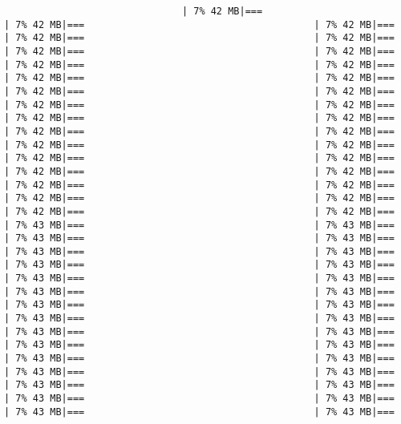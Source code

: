 \documentclass[
]{article}
\begin{document}
\begin{verbatim}
                               | 7% 42 MB|===                                        | 7% 42 MB|===                                        | 7% 42 MB|===                                        | 7% 42 MB|===                                        | 7% 42 MB|===                                        | 7% 42 MB|===                                        | 7% 42 MB|===                                        | 7% 42 MB|===                                        | 7% 42 MB|===                                        | 7% 42 MB|===                                        | 7% 42 MB|===                                        | 7% 42 MB|===                                        | 7% 42 MB|===                                        | 7% 42 MB|===                                        | 7% 42 MB|===                                        | 7% 42 MB|===                                        | 7% 42 MB|===                                        | 7% 42 MB|===                                        | 7% 42 MB|===                                        | 7% 42 MB|===                                        | 7% 42 MB|===                                        | 7% 42 MB|===                                        | 7% 42 MB|===                                        | 7% 42 MB|===                                        | 7% 42 MB|===                                        | 7% 42 MB|===                                        | 7% 42 MB|===                                        | 7% 42 MB|===                                        | 7% 42 MB|===                                        | 7% 42 MB|===                                        | 7% 42 MB|===                                        | 7% 43 MB|===                                        | 7% 43 MB|===                                        | 7% 43 MB|===                                        | 7% 43 MB|===                                        | 7% 43 MB|===                                        | 7% 43 MB|===                                        | 7% 43 MB|===                                        | 7% 43 MB|===                                        | 7% 43 MB|===                                        | 7% 43 MB|===                                        | 7% 43 MB|===                                        | 7% 43 MB|===                                        | 7% 43 MB|===                                        | 7% 43 MB|===                                        | 7% 43 MB|===                                        | 7% 43 MB|===                                        | 7% 43 MB|===                                        | 7% 43 MB|===                                        | 7% 43 MB|===                                        | 7% 43 MB|===                                        | 7% 43 MB|===                                        | 7% 43 MB|===                                        | 7% 43 MB|===                                        | 7% 43 MB|===                                        | 7% 43 MB|===                                        | 7% 43 MB|===                                        | 7% 43 MB|===                                        | 7% 43 MB|===                                        | 7% 43 MB|===                                        | 7% 43 MB|===                                  
\end{verbatim}
\end{document}

